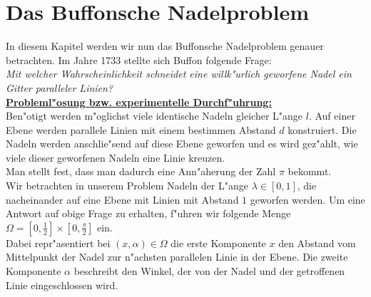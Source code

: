\section{Das Buffonsche Nadelproblem}

In diesem Kapitel werden wir nun das Buffonsche Nadelproblem genauer betrachten. Im Jahre 1733 stellte sich Buffon folgende Frage:\\
\textit{Mit welcher Wahrscheinlichkeit schneidet eine willk"urlich geworfene Nadel ein Gitter paralleler Linien?}\\

\underline{\textbf{Probleml"osung bzw. experimentelle Durchf"uhrung:}}\\[0,2cm]

Ben"otigt werden m"oglichst viele identische Nadeln gleicher L"ange $l$. Auf einer Ebene werden parallele Linien mit einem bestimmen Abstand $d$ konstruiert. Die Nadeln werden anschlie"send auf diese Ebene geworfen und es wird gez"ahlt, wie viele dieser geworfenen Nadeln eine Linie kreuzen.\\ Man stellt fest, dass man dadurch eine Ann"aherung der Zahl $\pi$ bekommt.\\
Wir betrachten in unserem Problem Nadeln der L"ange $\lambda \in [0,1]$, die nacheinander auf eine Ebene mit Linien mit Abstand $1$ geworfen werden.  Um eine Antwort auf obige Frage zu erhalten, f"uhren wir folgende Menge  $\Omega=[0,\frac{1}{2}]\times [0,\frac{\pi}{2}] $ ein.\\
Dabei repr"asentiert bei $(x,\alpha)\in \Omega$ die erste Komponente $x$ den Abstand vom Mittelpunkt der Nadel zur n"achsten parallelen Linie in der Ebene. Die zweite Komponente $\alpha$ beschreibt den Winkel, der von der Nadel und der getroffenen Linie eingeschlossen wird.

